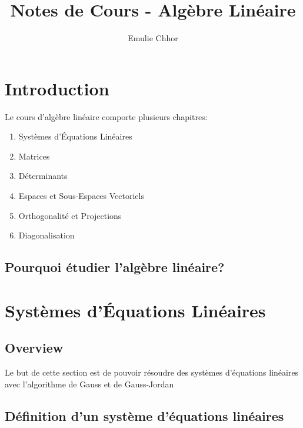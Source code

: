 \documentclass{article}
\begin{document}
\title{Notes de Cours - Algèbre Linéaire}
\author{Emulie Chhor}
\maketitle

\section*{Introduction}

Le cours d'algèbre linéaire comporte plusieurs chapitres:

    \begin{enumerate}
	\item Systèmes d'Équations Linéaires
	\item Matrices
	\item Déterminants
	\item Espaces et Sous-Espaces Vectoriels
	\item Orthogonalité et Projections
	\item Diagonalisation
    \end{enumerate}

\newtheorem{definition}{Definition}[subsection]
\newtheorem{theorem}{Theorem}[subsection]
\newtheorem{corollary}{Corollary}[subsection]
\newtheorem{lemma}[theorem]{Lemma}
\newtheorem{proposition}{Proposition}[section]
\newtheorem{axiom}{Axiome}
\newtheorem{property}{Propriété}[subsection]
\newtheorem*{remark}{Remarque}
\newtheorem*{problem}{Problème}
\newtheorem*{intuition}{Intuition}

\subsection{Pourquoi étudier l'algèbre linéaire?}

\pagebreak

\section{Systèmes d'Équations Linéaires}

\subsection{Overview}

Le but de cette section est de pouvoir résoudre des systèmes d'équations linéaires
avec l'algorithme de Gauss et de Gauss-Jordan

\subsection{Définition d'un système d'équations linéaires}
\end{document}
